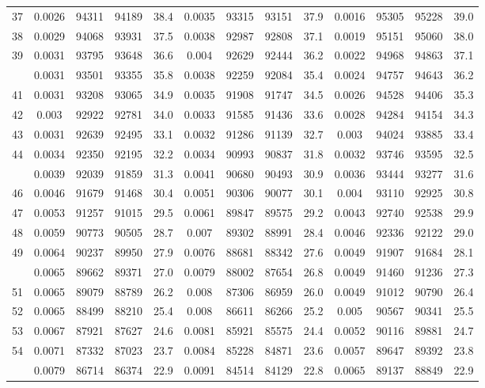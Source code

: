 \documentclass[
  14pt,
]{article}
\begin{document}
\begin{longtable}[t]{lcccccccccccc}
37 & 0.0026 & 94311 & 94189 & 38.4 & 0.0035 & 93315 & 93151 & 37.9 & 0.0016 & 95305 & 95228 & 39.0\\
38 & 0.0029 & 94068 & 93931 & 37.5 & 0.0038 & 92987 & 92808 & 37.1 & 0.0019 & 95151 & 95060 & 38.0\\
39 & 0.0031 & 93795 & 93648 & 36.6 & 0.004 & 92629 & 92444 & 36.2 & 0.0022 & 94968 & 94863 & 37.1\\
\addlinespace
40 & 0.0031 & 93501 & 93355 & 35.8 & 0.0038 & 92259 & 92084 & 35.4 & 0.0024 & 94757 & 94643 & 36.2\\
41 & 0.0031 & 93208 & 93065 & 34.9 & 0.0035 & 91908 & 91747 & 34.5 & 0.0026 & 94528 & 94406 & 35.3\\
42 & 0.003 & 92922 & 92781 & 34.0 & 0.0033 & 91585 & 91436 & 33.6 & 0.0028 & 94284 & 94154 & 34.3\\
43 & 0.0031 & 92639 & 92495 & 33.1 & 0.0032 & 91286 & 91139 & 32.7 & 0.003 & 94024 & 93885 & 33.4\\
44 & 0.0034 & 92350 & 92195 & 32.2 & 0.0034 & 90993 & 90837 & 31.8 & 0.0032 & 93746 & 93595 & 32.5\\
\addlinespace
45 & 0.0039 & 92039 & 91859 & 31.3 & 0.0041 & 90680 & 90493 & 30.9 & 0.0036 & 93444 & 93277 & 31.6\\
46 & 0.0046 & 91679 & 91468 & 30.4 & 0.0051 & 90306 & 90077 & 30.1 & 0.004 & 93110 & 92925 & 30.8\\
47 & 0.0053 & 91257 & 91015 & 29.5 & 0.0061 & 89847 & 89575 & 29.2 & 0.0043 & 92740 & 92538 & 29.9\\
48 & 0.0059 & 90773 & 90505 & 28.7 & 0.007 & 89302 & 88991 & 28.4 & 0.0046 & 92336 & 92122 & 29.0\\
49 & 0.0064 & 90237 & 89950 & 27.9 & 0.0076 & 88681 & 88342 & 27.6 & 0.0049 & 91907 & 91684 & 28.1\\
\addlinespace
50 & 0.0065 & 89662 & 89371 & 27.0 & 0.0079 & 88002 & 87654 & 26.8 & 0.0049 & 91460 & 91236 & 27.3\\
51 & 0.0065 & 89079 & 88789 & 26.2 & 0.008 & 87306 & 86959 & 26.0 & 0.0049 & 91012 & 90790 & 26.4\\
52 & 0.0065 & 88499 & 88210 & 25.4 & 0.008 & 86611 & 86266 & 25.2 & 0.005 & 90567 & 90341 & 25.5\\
53 & 0.0067 & 87921 & 87627 & 24.6 & 0.0081 & 85921 & 85575 & 24.4 & 0.0052 & 90116 & 89881 & 24.7\\
54 & 0.0071 & 87332 & 87023 & 23.7 & 0.0084 & 85228 & 84871 & 23.6 & 0.0057 & 89647 & 89392 & 23.8\\
\addlinespace
55 & 0.0079 & 86714 & 86374 & 22.9 & 0.0091 & 84514 & 84129 & 22.8 & 0.0065 & 89137 & 88849 & 22.9\\

\end{longtable}
\end{document}
